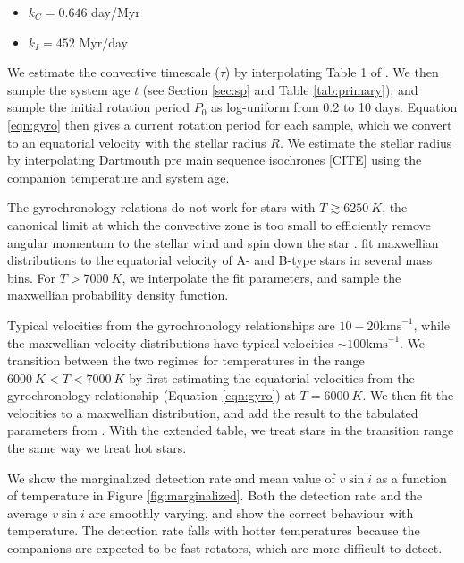\documentclass{emulateapj}
\begin{document}
\begin{itemize}
\item $k_C = 0.646$ day/Myr
\item $k_I = 452$ Myr/day
\end{itemize}
We estimate the convective timescale ($\tau$) by interpolating Table 1 of \citet{Barnes2010a}. We then sample the system age $t$ (see Section \ref{sec:sp} and Table \ref{tab:primary}), and sample the initial rotation period $P_0$ as log-uniform from 0.2 to 10 days. Equation \ref{eqn:gyro} then gives a current rotation period for each sample, which we convert to an equatorial velocity with the stellar radius $R$. We estimate the stellar radius by interpolating Dartmouth pre main sequence isochrones [CITE] using the companion temperature and system age. 

The gyrochronology relations do not work for stars with $T \gtrsim 6250\ K$, the canonical limit at which the convective zone is too small to efficiently remove angular momentum to the stellar wind and spin down the star \citep{Pinsonneault2001}. \citet{Zorec2012} fit maxwellian distributions to the equatorial velocity of A- and B-type stars in several mass bins. For $T > 7000\ K$, we interpolate the fit parameters, and sample the maxwellian probability density function. 

Typical velocities from the gyrochronology relationships are $10-20 \mathrm{km s}^{-1}$, while the maxwellian velocity distributions have typical velocities $\sim 100 \mathrm{km s}^{-1}$. We transition between the two regimes for temperatures in the range $6000\ K < T < 7000\ K$ by first estimating the equatorial velocities from the gyrochronology relationship (Equation \ref{eqn:gyro}) at $T=6000\ K$. We then fit the velocities to a maxwellian distribution, and add the result to the tabulated parameters from \citep{Zorec2012}. With the extended table, we treat stars in the transition range the same way we treat hot stars.
 
We show the marginalized detection rate and mean value of $v\sin{i}$ as a function of temperature in Figure \ref{fig:marginalized}. Both the detection rate and the average $v\sin{i}$ are smoothly varying, and show the correct behaviour with temperature. The detection rate falls with hotter temperatures because the companions are expected to be fast rotators, which are more difficult to detect.
\end{document}
